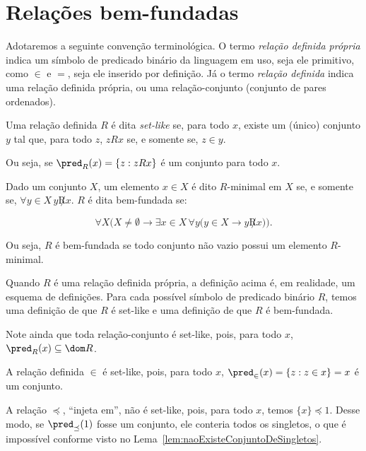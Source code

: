 \section{Relações bem-fundadas}

Adotaremos a seguinte convenção terminológica.
O termo \emph{relação definida própria} indica um símbolo de predicado binário da linguagem em uso, seja ele primitivo, como $\in$ e $=$, seja ele inserido por definição.
Já o termo \emph{relação definida} indica uma relação definida própria, ou uma relação-conjunto (conjunto de pares ordenados).

\begin{definition}[$\BST$]
    Uma relação definida $R$ é dita \emph{set-like} se, para todo $x$, existe um (único) conjunto $y$ tal que, para todo $z$, $z R x$ se, e somente se, $z\in y$.

    Ou seja, se $\pred_{R}(x)=\{z: z R x\}$ é um conjunto para todo $x$.

    Dado um conjunto $X$, um elemento $x\in X$ é dito $R$-minimal em $X$ se, e somente se, $\forall y\in X\, y \not R x$.
    $R$ é dita bem-fundada se:

    \[
        \forall X\big(X\neq \emptyset \rightarrow \exists x\in X \, \forall y\big(y\in X \rightarrow y \not R x\big)\big).
    \]

    Ou seja, $R$ é bem-fundada se todo conjunto não vazio possui um elemento $R$-minimal.
\end{definition}

Quando $R$ é uma relação definida própria, a definição acima é, em realidade, um esquema de definições.
Para cada possível símbolo de predicado binário $R$, temos uma definição de que $R$ é set-like e uma definição de que $R$ é bem-fundada.

Note ainda que toda relação-conjunto é set-like, pois, para todo $x$, $\pred_{R}(x)\subseteq\dom R$.

\begin{example}[$\BST$]
    A relação definida $\in$ é set-like, pois, para todo $x$, $\pred_{\in}(x)=\{z: z\in x\}=x$ é um conjunto.
\end{example}

\begin{example}[$\BST$]
    A relação $\preceq$, ``injeta em'', não é set-like, pois, para todo $x$, temos $\{x\}\preceq 1$.
    Desse modo, se $\pred_{\preceq}(1)$ fosse um conjunto, ele conteria todos os singletos, o que é impossível conforme visto no Lema~\ref{lem:naoExisteConjuntoDeSingletos}.
\end{example}

